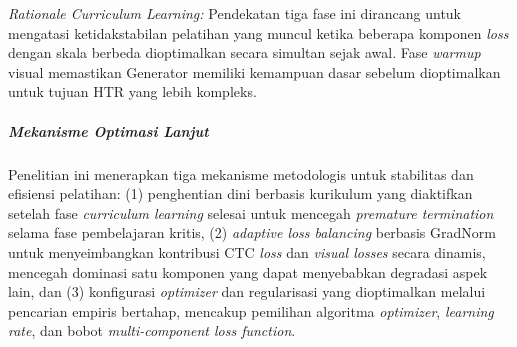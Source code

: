 \documentclass[12pt,a4paper]{book}
\begin{document}
\textit{Rationale Curriculum Learning:} Pendekatan tiga fase ini dirancang untuk mengatasi ketidakstabilan pelatihan yang muncul ketika beberapa komponen \textit{loss} dengan skala berbeda dioptimalkan secara simultan sejak awal. Fase \textit{warmup} visual memastikan Generator memiliki kemampuan dasar sebelum dioptimalkan untuk tujuan HTR yang lebih kompleks.

\subparagraph{Mekanisme Optimasi Lanjut}
Penelitian ini menerapkan tiga mekanisme metodologis untuk stabilitas dan efisiensi pelatihan: (1) penghentian dini berbasis kurikulum yang diaktifkan setelah fase \textit{curriculum learning} selesai untuk mencegah \textit{premature termination} selama fase pembelajaran kritis, (2) \textit{adaptive loss balancing} berbasis GradNorm untuk menyeimbangkan kontribusi CTC \textit{loss} dan \textit{visual losses} secara dinamis, mencegah dominasi satu komponen yang dapat menyebabkan degradasi aspek lain, dan (3) konfigurasi \textit{optimizer} dan regularisasi yang dioptimalkan melalui pencarian empiris bertahap, mencakup pemilihan algoritma \textit{optimizer}, \textit{learning rate}, dan bobot \textit{multi-component loss function}.
\end{document}

